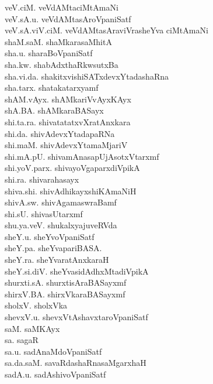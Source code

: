 {\begin{multicols}{2}
\begin{tabbing}
veV.ciM. \> veVdAMtaciMtAmaNi\\[2pt]
veV.sA.u. \> veVdAMtasAroVpaniSatf\\[2pt]
veV.sA.viV.ciM. \> veVdAMtasAraviVrasheYva ciMtAmaNi\\[2pt]
shaM.saM. \> shaMkarasaMhitA\\[2pt]
sha.u. \> sharaBoVpaniSatf\\[2pt]
sha.kw. \> shabAdxthaRkwsutxBa\\[2pt]
sha.vi.da. \> shakitxvishiSATxdevxYtadashaRna\\[2pt]
sha.tarx. \> shatakatarxyamf\\[2pt]
shAM.vAyx. \> shAMkariVvAyxKAyx\\[2pt]
shA.BA. \> shAMkaraBASayx\\[2pt]
shi.ta.ra. \> shivatatatxvXratAnxkara\\[2pt]
shi.da. \> shivAdevxYtadapaRNa\\[2pt]
shi.maM. \> shivAdevxYtamaMjariV\\[2pt]
shi.mA.pU. \> shivamAnasapUjAsotxVtarxmf\\[2pt]
shi.yoV.parx. \> shivayoVgaparxdiVpikA\\[2pt]
shi.ra. \> shivarahasayx\\[2pt]
shiva.shi. \> shivAdhikayxshiKAmaNiH\\[2pt]
shivA.sw. \> shivAgamaswraBamf\\[2pt]
shi.sU. \> shivasUtarxmf\\[2pt]
shu.ya.veV. \> shukalxyajuveRVda\\[2pt]
sheY.u. \> sheYvoVpaniSatf\\[2pt]
sheY.pa. \> sheYvapariBASA.\\[2pt]
sheY.ra. \> sheYvaratAnxkaraH\\[2pt]
sheY.si.diV. \> sheYvasidAdhxMtadiVpikA\\[2pt]
shurxti.sA. \> shurxtisAraBASayxmf\\[2pt]
shirxV.BA. \> shirxVkaraBASayxmf\\[2pt]
sholxV. \> sholxVka\\[2pt]
shevxV.u. \> shevxVtAshavxtaroVpaniSatf\\[2pt]
saM. \> saMKAyx\\[2pt]
sa. \> sagaR\\[2pt]
sa.u. \> sadAnaMdoVpaniSatf\\[2pt]
sa.da.saM. \> savaRdashaRnasaMgarxhaH\\[2pt]
sadA.u. \> sadAshivoVpaniSatf\\[2pt]

\end{tabbing}
\end{multicols}}

